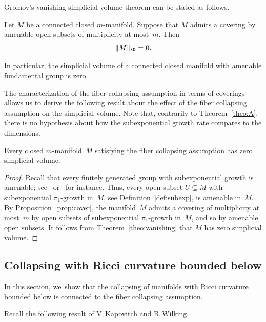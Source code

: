 Gromov's vanishing simplicial volume theorem can be stated as follows.

\begin{theorem} \label{theo:vanishing}
Let $M$ be a connected closed $m$\nobreakdash-manifold.
Suppose that $M$ admits a covering by amenable open subsets of multiplicity at most~$m$.
Then
\[
\Vert M \Vert_{\D} =0.
\]

In particular, the simplicial volume of a connected closed manifold with amenable fundamental group is zero.
\end{theorem}

The characterization of the fiber collapsing assumption in terms of coverings allows us to derive the following result about the effect of the fiber collapsing assumption on the simplicial volume.
Note that, contrarily to Theorem~\ref{theo:A}, there is no hypothesis about how the subexponential growth rate compares to the dimensions.

\begin{proposition} \label{prop:0simplicial}
Every closed $m$\nobreakdash-manifold~$M$ satisfying the fiber collapsing assumption has zero simplicial volume.
\end{proposition}

\begin{proof}
Recall that every finitely generated group with subexponential growth is amen\-able; see~\cite{AS57} or~\cite[Th.\,6.11.12]{CSC} for instance.
Thus, every open subset \hbox{$U\!\subseteq\!M$} with subexponential $\pi_1$-growth in~$M$, see Definition~\ref{def:subexp}, is amenable in~$M$.
By Proposition~\ref{prop:cover}, the manifold~$M$ admits a covering of multiplicity at most~$m$ by open subsets of subexponential $\pi_1$-growth in~$M$, and so by amenable open subsets.
It follows from Theorem~\ref{theo:vanishing} that $M$ has zero simplicial volume.
\end{proof}

\subsection{Collapsing with Ricci curvature bounded below}

In this section, we~show that the collapsing of manifolds with Ricci curvature bounded below is connected to the fiber collapsing assumption.

Recall the following result of V.\,Kapovitch and B.\,Wilking.

